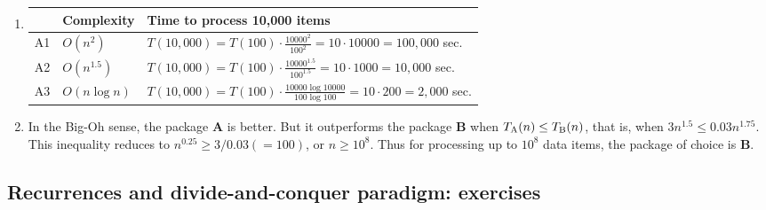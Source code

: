 \documentclass[]{article}
\begin{document}
\begin{enumerate}
\item
\begin{tabular}{|c|l|l|} \hline
     & Complexity   & Time to process 10,000 items \\ \hline
A1 \begin{minipage}{1mm}  \vspace{3mm}
\end{minipage} & $O(n^{2})$ & $T(10,000) = T(100) \cdot \frac{10000^2}{100^2}
                       = 10 \cdot 10000 = 100,000$ sec. \\
A2 \begin{minipage}{1mm}  \vspace{3mm}
\end{minipage} & $O(n^{1.5})$ & $T(10,000) = T(100) \cdot 
                       \frac{10000^{1.5}}{100^{1.5}}
                       = 10 \cdot 1000 = 10,000$ sec.\\           
A3 \begin{minipage}{1mm}  \vspace{3mm}
\end{minipage} & $O(n \log n)$ &    
$T(10,000) = T(100) \cdot \frac{10000\log 10000}{100\log 100}
= 10 \cdot 200 = 2,000$ sec.\\ \hline
\end{tabular} 

\item
In the Big-Oh sense, the package \textbf{A} is better. But it 
outperforms the package \textbf{B} when $T_{\rm A}(n) \le T_{\rm B}(n)$,
that is, when $3n^{1.5} \le 0.03 n^{1.75}$. This inequality reduces to
$n^{0.25} \ge 3/0.03 (=100)$, or $n \ge 10^{8}$. Thus for processing up to
$10^{8}$ data items, the package of choice is {\bf B}.

\end{enumerate}

\subsection{Recurrences and divide-and-conquer paradigm: exercises}
\end{document}
